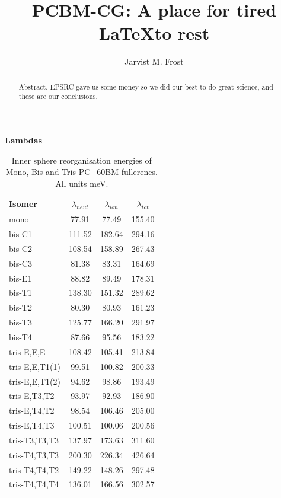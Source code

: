 \documentclass[journal=nanofd,manuscript=suppinfo]{achemso}
\title{PCBM-CG: A place for tired \LaTeX to rest}
\author{Jarvist M. Frost}
\affiliation{Centre for Sustainable Chemical Technologies and Department of Chemistry, University of Bath, Claverton Down, Bath BA2 7AY, UK}
\begin{document}
\begin{abstract}
Abstract. EPSRC gave us some money so we did our best to do great science, and these are our conclusions. 
\end{abstract}



\textbf{Lambdas}

\begin{table}
\centering
\begin{tabular}{lSSS}
\toprule
Isomer & $\lambda_{neut}$ & $\lambda_{ion}$ & $\lambda_{tot}$ \\
\midrule
mono & 77.91 & 77.49 & 155.40 \\
\midrule
bis-C1 & 111.52 & 182.64 & 294.16 \\
bis-C2 & 108.54 & 158.89 & 267.43 \\
bis-C3 & 81.38 & 83.31 & 164.69 \\
bis-E1 & 88.82 & 89.49 & 178.31 \\
bis-T1 & 138.30 & 151.32 & 289.62 \\
bis-T2 & 80.30 & 80.93 & 161.23 \\
bis-T3 & 125.77 & 166.20 & 291.97 \\
bis-T4 & 87.66 & 95.56 & 183.22 \\
\midrule
tris-E,E,E & 108.42 & 105.41 & 213.84 \\
tris-E,E,T1(1) & 99.51 & 100.82 & 200.33 \\
tris-E,E,T1(2) & 94.62 & 98.86 & 193.49 \\
tris-E,T3,T2 & 93.97 & 92.93 & 186.90 \\
tris-E,T4,T2 & 98.54 & 106.46 & 205.00 \\
tris-E,T4,T3 & 100.51 & 100.06 & 200.56 \\
tris-T3,T3,T3 & 137.97 & 173.63 & 311.60 \\
tris-T4,T3,T3 & 200.30 & 226.34 & 426.64 \\
tris-T4,T4,T2 & 149.22 & 148.26 & 297.48 \\
tris-T4,T4,T4 & 136.01 & 166.56 & 302.57 \\
\bottomrule
\end{tabular}
\caption{\label{tab:Lambda}
Inner sphere reorganisation energies of Mono, Bis and Tris PC$-{60}$BM fullerenes. All units meV.}
\end{table}
\end{document}

